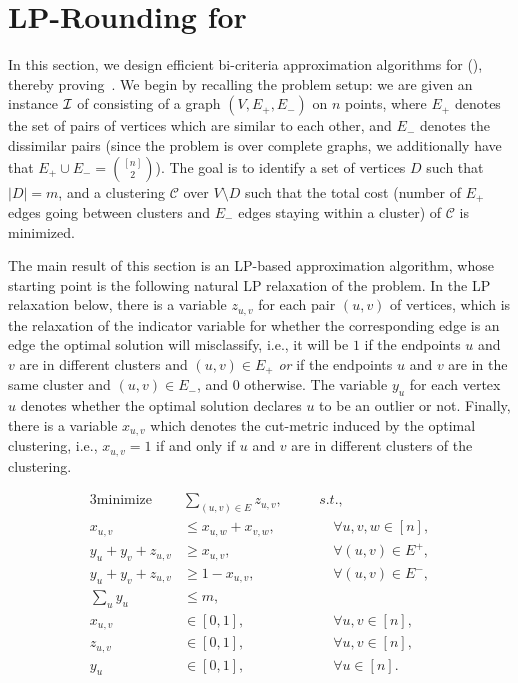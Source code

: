 \section{LP-Rounding for \robcc}
In this section, we design efficient bi-criteria approximation algorithms for \robcc (), thereby proving~. We begin by recalling the problem setup: we are given an instance ${\cal I}$ of \robcc consisting of a graph $(V, E_{+}, E_{-})$ on $n$ points, where $E_{+}$ denotes the set of pairs of vertices which are similar to each other, and $E_{-}$ denotes the dissimilar pairs (since the problem is over complete graphs, we additionally have that $E_{+} \cup E_{-} = \binom{[n]}{2}$). The goal is to identify a set of vertices $D$ such that $|D| = m$, and a clustering $\mathcal{C}$ over $V\setminus D$ such that the total cost (number of $E_{+}$ edges going between clusters and $E_{-}$ edges staying within a cluster) of $\mathcal{C}$ is minimized.

The main result of this section is an LP-based approximation algorithm, whose starting point is the following natural LP relaxation of the problem. In the LP relaxation below, there is a variable $z_{u,v}$ for each pair $(u,v)$ of vertices, which is the relaxation of the indicator variable for whether the corresponding edge is an edge the optimal solution will misclassify, i.e., it will be $1$ if the endpoints $u$ and $v$ are in different clusters and $(u,v) \in E_{+}$ \emph{or} if the endpoints $u$ and $v$ are in the same cluster and $(u,v) \in E_{-}$, and $0$ otherwise. The variable $y_u$ for each vertex $u$ denotes whether the optimal solution declares $u$ to be an outlier or not. Finally, there is a variable $x_{u,v}$ which denotes the cut-metric induced by the optimal clustering, i.e., $x_{u,v} = 1$ if and only if $u$ and $v$ are in different clusters of the clustering. 

\begin{alignat}{3} \label{LP:CC5}
		\text{minimize} &\sum_{(u,v) \in E} z_{u,v}, && \quad s.t., \tag{LP5}\\
		x_{u,v} &\le x_{u,w} + x_{v,w}, &&\qquad \forall u,v,w \in [n], \label{LP:CC5:1}\\
		y_u + y_v + z_{u,v} &\ge x_{u,v},&&\qquad \forall (u,v) \in E^+, \label{LP:CC5:1}\\
		y_u + y_v + z_{u,v} &\ge 1 - x_{u,v}, &&\qquad \forall (u,v) \in E^-, \label{LP:CC5:1}\\
		\sum_{u} y_u &\le m, \label{LP:CC5:1} \\
		x_{u,v} &\in [ 0,1 ], &&\qquad \forall u,v \in [n], \nonumber\\
		z_{u,v} &\in [ 0,1 ], &&\qquad \forall u,v \in [n],\nonumber\\
		y_u &\in [ 0,1 ], &&\qquad \forall u \in [n]. \nonumber
\end{alignat}


